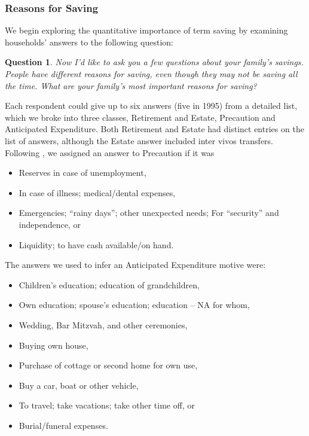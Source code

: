 \documentclass[fleqccn,12pt]{article}
\newtheorem{question}[theorem]{Question}
\begin{document}
\subsubsection{Reasons for Saving}

We begin exploring the quantitative importance of term saving by examining households' answers to the following question:

\begin{question} 
\label{question:SavingsMotives}
Now I'd like to ask you a few questions about your family's savings. People have different reasons for saving, even though they may not be saving all the time. What are your family's most important reasons for saving?
\end{question}

\noindent Each respondent could give up to six answers (five in 1995) from a detailed list, which we broke into three classes, Retirement and Estate, Precaution and Anticipated Expenditure. Both Retirement and Estate had distinct entries on the list of answers, although the Estate answer included inter vivos transfers. Following \cite{nber2004LusardiKennickell}, we assigned an answer to Precaution if it was
\begin{itemize}
\item Reserves in case of unemployment,
\item In case of illness; medical/dental expenses,
\item Emergencies; ``rainy days'';
other unexpected needs; For ``security'' and independence, or
\item Liquidity; to have cash available/on hand.
\end{itemize}

\noindent The answers we used to infer an Anticipated Expenditure motive were:
\begin{itemize}
\item Children's education; education of grandchildren,
\item Own education; spouse's education; education -- NA for whom,
\item Wedding, Bar Mitzvah, and other ceremonies, 
\item Buying own house,
\item Purchase of cottage or second home for own use, 
\item Buy a car, boat or other vehicle,
\item To travel; take vacations; take other time off, or
\item Burial/funeral expenses.
\end{itemize}
\end{document}
